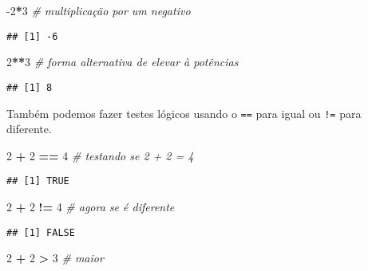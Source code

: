 \documentclass[]{article}
\newenvironment{Shaded}{\begin{snugshade}}{\end{snugshade}}
\newcommand{\CommentTok}[1]{\textcolor[rgb]{0.56,0.35,0.01}{\textit{#1}}}
\newcommand{\DecValTok}[1]{\textcolor[rgb]{0.00,0.00,0.81}{#1}}
\newcommand{\OperatorTok}[1]{\textcolor[rgb]{0.81,0.36,0.00}{\textbf{#1}}}
\newcommand{\StringTok}[1]{\textcolor[rgb]{0.31,0.60,0.02}{#1}}
\begin{document}
\begin{Shaded}
\begin{Highlighting}[]
\DecValTok{-2}\OperatorTok{*}\DecValTok{3} \CommentTok{# multiplicação por um negativo}
\end{Highlighting}
\end{Shaded}

\begin{verbatim}
## [1] -6
\end{verbatim}

\begin{Shaded}
\begin{Highlighting}[]
\DecValTok{2}\OperatorTok{**}\DecValTok{3} \CommentTok{# forma alternativa de elevar à potências}
\end{Highlighting}
\end{Shaded}

\begin{verbatim}
## [1] 8
\end{verbatim}

Também podemos fazer testes lógicos usando o \texttt{==} para igual ou
\texttt{!=} para diferente.

\begin{Shaded}
\begin{Highlighting}[]
\DecValTok{2} \OperatorTok{+}\StringTok{ }\DecValTok{2} \OperatorTok{==}\StringTok{ }\DecValTok{4} \CommentTok{# testando se 2 + 2 = 4}
\end{Highlighting}
\end{Shaded}

\begin{verbatim}
## [1] TRUE
\end{verbatim}

\begin{Shaded}
\begin{Highlighting}[]
\DecValTok{2} \OperatorTok{+}\StringTok{ }\DecValTok{2} \OperatorTok{!=}\StringTok{ }\DecValTok{4} \CommentTok{# agora se é diferente}
\end{Highlighting}
\end{Shaded}

\begin{verbatim}
## [1] FALSE
\end{verbatim}

\begin{Shaded}
\begin{Highlighting}[]
\DecValTok{2} \OperatorTok{+}\StringTok{ }\DecValTok{2} \OperatorTok{>}\StringTok{ }\DecValTok{3} \CommentTok{# maior}
\end{Highlighting}
\end{Shaded}
\end{document}

